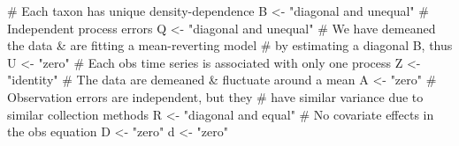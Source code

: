 \begin{Schunk}
\begin{Sinput}
 # Each taxon has unique density-dependence
 B <- "diagonal and unequal"
 # Independent process errors
 Q <- "diagonal and unequal"
 # We have demeaned the data & are fitting a mean-reverting model
 # by estimating a diagonal B, thus
 U <- "zero"
 # Each obs time series is associated with only one process
 Z <- "identity"
 # The data are demeaned & fluctuate around a mean
 A <- "zero"
 # Observation errors are independent, but they
 # have similar variance due to similar collection methods
 R <- "diagonal and equal"
 # No covariate effects in the obs equation
 D <- "zero"
 d <- "zero"
\end{Sinput}
\end{Schunk}
